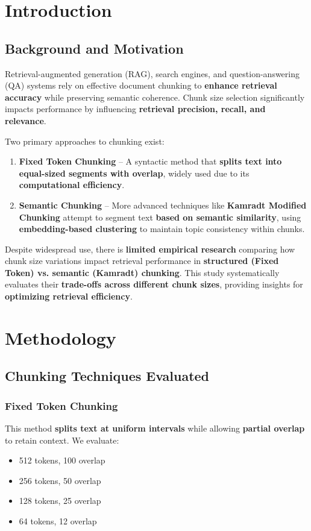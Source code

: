 \documentclass[a4paper,12pt]{article}
\begin{document}
\section{Introduction}

\subsection{Background and Motivation}
Retrieval-augmented generation (RAG), search engines, and question-answering (QA) systems rely on effective document chunking to \textbf{enhance retrieval accuracy} while preserving semantic coherence. Chunk size selection significantly impacts performance by influencing \textbf{retrieval precision, recall, and relevance}. 

Two primary approaches to chunking exist:
\begin{enumerate}
    \item \textbf{Fixed Token Chunking} – A syntactic method that \textbf{splits text into equal-sized segments with overlap}, widely used due to its \textbf{computational efficiency}.
    \item \textbf{Semantic Chunking} – More advanced techniques like \textbf{Kamradt Modified Chunking} attempt to segment text \textbf{based on semantic similarity}, using \textbf{embedding-based clustering} to maintain topic consistency within chunks.
\end{enumerate}

Despite widespread use, there is \textbf{limited empirical research} comparing how chunk size variations impact retrieval performance in \textbf{structured (Fixed Token) vs. semantic (Kamradt) chunking}. This study systematically evaluates their \textbf{trade-offs across different chunk sizes}, providing insights for \textbf{optimizing retrieval efficiency}.

\section{Methodology}

\subsection{Chunking Techniques Evaluated}
\subsubsection{Fixed Token Chunking}
This method \textbf{splits text at uniform intervals} while allowing \textbf{partial overlap} to retain context. We evaluate:
\begin{itemize}
    \item 512 tokens, 100 overlap
    \item 256 tokens, 50 overlap
    \item 128 tokens, 25 overlap
    \item 64 tokens, 12 overlap
\end{itemize}
\end{document}
